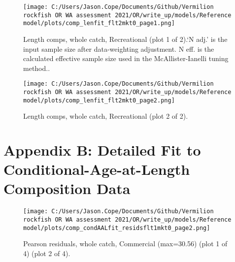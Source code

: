 \documentclass[11pt,
  english,
  a4paper,
]{article}
\begin{document}
\begin{figure}
\centering
\texttt{[image: C:/Users/Jason.Cope/Documents/Github/Vermilion rockfish OR WA assessment 2021/OR/write\_up/models/Reference model/plots/comp\_lenfit\_flt2mkt0\_page1.png]}
\caption{Length comps, whole catch, Recreational (plot 1 of 2).`N adj.' is the input sample size after data-weighting adjustment. N eff. is the calculated effective sample size used in the McAllister-Ianelli tuning method..\label{fig:comp_lenfit_flt2mkt0_page1}}
\end{figure}

\tagmcend\tagstructend


\begin{figure}
\centering
\texttt{[image: C:/Users/Jason.Cope/Documents/Github/Vermilion rockfish OR WA assessment 2021/OR/write\_up/models/Reference model/plots/comp\_lenfit\_flt2mkt0\_page2.png]}
\caption{Length comps, whole catch, Recreational (plot 2 of 2).\label{fig:comp_lenfit_flt2mkt0_page2}}
\end{figure}

\tagmcend\tagstructend

\clearpage


\hypertarget{app-b}{%
\section{Appendix B: Detailed Fit to Conditional-Age-at-Length Composition Data}\label{app-b}}

\leavevmode\tagmcend\tagstructend


\begin{figure}
\centering
\texttt{[image: C:/Users/Jason.Cope/Documents/Github/Vermilion rockfish OR WA assessment 2021/OR/write\_up/models/Reference model/plots/comp\_condAALfit\_residsflt1mkt0\_page2.png]}
\caption{Pearson residuals, whole catch, Commercial (max=30.56) (plot 1 of 4) (plot 2 of 4).\label{fig:comp_condAALfit_residsflt1mkt0_page2}}
\end{figure}
\end{document}
